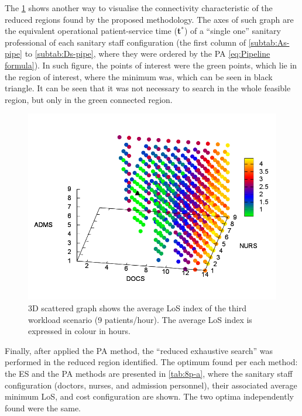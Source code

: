 \documentclass[11pt]{article} %
\begin{document}
The \ref{fig:3D-scattered-graph-50} shows another way to visualise
the connectivity characteristic of the reduced regions found by the
proposed methodology. The axes of such graph are the equivalent operational
patient-service time ({\bf t$^*$})  of a ``single
one'' sanitary professional of each sanitary staff configuration
(the first column of \ref{subtab:As-pipe} to \ref{subtab:Ds-pipe},
where they were ordered by the PA \ref{eq:Pipeline formula}). In
such figure, the points of interest were the green points, which lie
in the region of interest, where the minimum was, which can be seen
in black triangle. It can be seen that it was not necessary to search
in the whole feasible region, but only in the green connected region.
\begin{figure}[H]
\noindent \begin{centering}
\includegraphics[width=0.95\columnwidth,height=0.2\paperheight]{figs4/v0/6400-602-50-3D-scatter-LoS2}
\par\end{centering}

\caption{3D scattered graph shows the average LoS index of the third workload
scenario (9 patients/hour). The average LoS index is expressed in
colour in hours.\label{fig:3D-scattered-graph-50}}
\end{figure}

Finally, after applied the PA method, the \textquotedblleft{}reduced exhaustive search\textquotedblright{}
was performed in the reduced region identified. The optimum
found per each method: the ES and the PA
methods are presented in \ref{tab:8p-a}, where the sanitary staff
configuration (doctors, nurses, and admission personnel), their associated
average minimum LoS, and cost configuration are shown. The two optima
 independently found were the same. 
\end{document}
